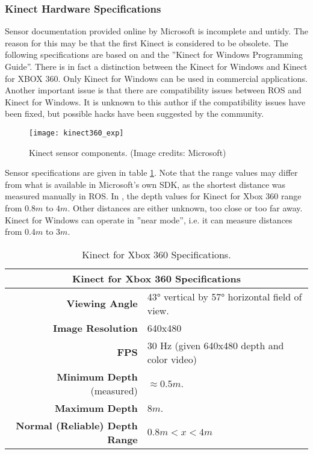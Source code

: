 \subsubsection{Kinect Hardware Specifications}

Sensor documentation provided online by Microsoft is incomplete and untidy. The reason for this may be that the first Kinect is considered to be obsolete. The following specifications are based on \cite{kinect_book} and the ''Kinect for Windows Programming Guide''\cite{kinect_guide}. There is in fact a distinction between the Kinect for Windows and Kinect for XBOX 360. Only Kinect for Windows can be used in commercial applications\cite{kinect_book}. Another important issue is that there are compatibility issues between \ac{ROS} and Kinect for Windows. It is unknown to this author if the compatibility issues have been fixed, but possible hacks have been suggested by the community\cite{kinect_discussion}\cite{kinect_hack}.

\begin{figure}[h]
    \centering
    \texttt{[image: kinect360\_exp]}
    \caption{Kinect sensor components. (Image credits: Microsoft\cite{kinect_guide})}
    \label{fig:kinect360_exp}
\end{figure}
Sensor specifications are given in table \ref{tab:kinect}. Note that the range values may differ from what is available in Microsoft's own SDK, as the shortest distance was measured manually in \ac{ROS}. In \cite{kinect_guide}, the depth values for Kinect for Xbox 360 range from $0.8 m$ to $4 m$. Other distances are either unknown, too close or too far away. Kinect for Windows can operate in ''near mode'', i.e. it can measure distances from $0.4 m$ to $3 m$.

\begin{table}
	\centering
	\begin{tabular}{ r | p{6.8cm} }
		\hline
		\multicolumn{2}{c}{Kinect for Xbox 360 Specifications}\\
		\hline
		\textbf{Viewing Angle} & 43° vertical by 57° horizontal field of view. \\
		\hline
		\textbf{Image Resolution} & 640x480 \\
		\hline
		\textbf{FPS} & 30 Hz (given 640x480 depth and color video)\\
		\hline
		\textbf{Minimum Depth} (measured) & $\approx 0.5m$.\\
		\hline
		\textbf{Maximum Depth} & $8 m$.\\
		\hline
		\textbf{Normal (Reliable) Depth Range} & $0.8m < x < 4m$\\
		\hline\hline
	\end{tabular}
	\caption{Kinect for Xbox 360 Specifications.}\label{tab:kinect}
\end{table}


